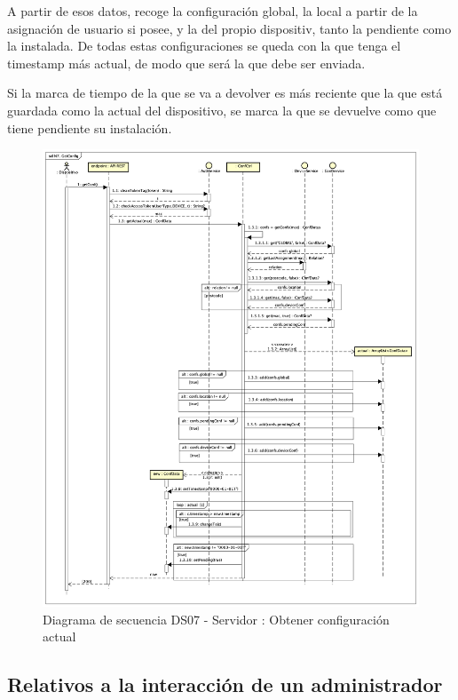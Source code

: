 A partir de esos datos, recoge la configuración global, la local a partir de la asignación de usuario si posee, y la del propio dispositiv, tanto la pendiente como la instalada. De todas estas configuraciones se queda con la que tenga el timestamp más actual, de modo que será la que debe ser enviada.

Si la marca de tiempo de la que se va a devolver es más reciente que la que está guardada como la actual del dispositivo, se marca la que se devuelve como que tiene pendiente su instalación.

\begin{figure}[H]
    \centering
    \includegraphics[width=14cm]{./img/sequence/diagram/getConfig.png}
    \caption{Diagrama de secuencia DS07 - Servidor : Obtener configuración actual}
    \label{fig:seq.GetCurrentConf}
\end{figure}

\subsection{Relativos a la interacción de un administrador}

